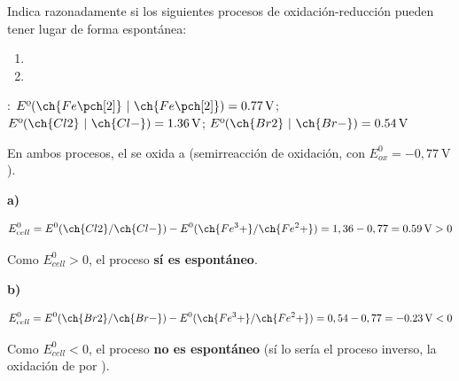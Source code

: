 \begin{exerciseEVAU}
    Indica razonadamente si los siguientes procesos de oxidación-reducción pueden tener lugar de forma espontánea:
    \begin{enumerate}[label=\letraminuscula]
        \item {}
        \item {}
    \end{enumerate}
    \datos{}: \( E\text{º}(\ch{Fe\pch[2]}\ | \ \ch{Fe\pch[2]}) = \SI{0.77}{\volt} \); \( E\text{º}(\ch{Cl2}\ | \ \ch{Cl-}) = \SI{1.36}{\volt} \); \( E\text{º}(\ch{Br2}\ | \ \ch{Br-}) = \SI{0.54}{\volt} \)

    \begin{solu}


        En ambos procesos, el  se oxida a  (semirreacción de oxidación, con \(E^0_{ox} = -0,77\ \si{\volt}\)).

        \textbf{a) }

        \begin{equation*}
            E^0_{cell} = E^0(\ch{Cl2}/\ch{Cl-}) - E^0(\ch{Fe^3+}/\ch{Fe^2+}) = 1,36-0,77 = \SI{0.59}{\volt} > 0
        \end{equation*}

        Como \(E^0_{cell} > 0\), el proceso \textbf{sí es espontáneo}.

        \textbf{b) }

        \begin{equation*}
            E^0_{cell} = E^0(\ch{Br2}/\ch{Br-}) - E^0(\ch{Fe^3+}/\ch{Fe^2+}) = 0,54-0,77 = \SI{-0.23}{\volt} < 0
        \end{equation*}

        Como \(E^0_{cell} < 0\), el proceso \textbf{no es espontáneo} (sí lo sería el proceso inverso, la oxidación de  por ).

    \end{solu}
\end{exerciseEVAU}

